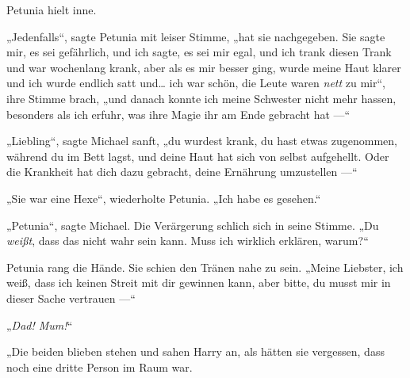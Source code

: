 Petunia hielt inne.

„Jedenfalls“, sagte Petunia mit leiser Stimme, „hat sie nachgegeben. Sie sagte mir, es sei gefährlich, und ich sagte, es sei mir egal, und ich trank diesen Trank und war wochenlang krank, aber als es mir besser ging, wurde meine Haut klarer und ich wurde endlich satt und… ich war schön, die Leute waren \emph{nett} zu mir“, ihre Stimme brach, „und danach konnte ich meine Schwester nicht mehr hassen, besonders als ich erfuhr, was ihre Magie ihr am Ende gebracht hat —“

„Liebling“, sagte Michael sanft, „du wurdest krank, du hast etwas zugenommen, während du im Bett lagst, und deine Haut hat sich von selbst aufgehellt. Oder die Krankheit hat dich dazu gebracht, deine Ernährung umzustellen —“

„Sie war eine Hexe“, wiederholte Petunia. „Ich habe es gesehen.“

„Petunia“, sagte Michael. Die Verärgerung schlich sich in seine Stimme. „Du \emph{weißt}, dass das nicht wahr sein kann. Muss ich wirklich erklären, warum?“

Petunia rang die Hände. Sie schien den Tränen nahe zu sein. „Meine Liebster, ich weiß, dass ich keinen Streit mit dir gewinnen kann, aber bitte, du musst mir in dieser Sache vertrauen —“

„\emph{Dad! Mum!}“

„Die beiden blieben stehen und sahen Harry an, als hätten sie vergessen, dass noch eine dritte Person im Raum war.

